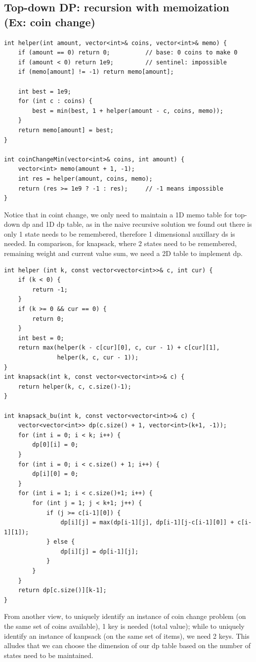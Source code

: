 \documentclass[9pt]{extarticle}
\begin{document}
\subsection*{Top-down DP: recursion with memoization (Ex: coin change)}
\begin{lstlisting}
int helper(int amount, vector<int>& coins, vector<int>& memo) {
    if (amount == 0) return 0;          // base: 0 coins to make 0
    if (amount < 0) return 1e9;         // sentinel: impossible
    if (memo[amount] != -1) return memo[amount];

    int best = 1e9;
    for (int c : coins) {
        best = min(best, 1 + helper(amount - c, coins, memo));
    }
    return memo[amount] = best;
}

int coinChangeMin(vector<int>& coins, int amount) {
    vector<int> memo(amount + 1, -1);
    int res = helper(amount, coins, memo);
    return (res >= 1e9 ? -1 : res);     // -1 means impossible
}
\end{lstlisting}
Notice that in coint change, we only need to maintain a 1D memo table for top-down dp and 1D dp table, 
as in the naive recursive solution we found out there is only 1 state needs to be remembered, therefore
1 dimensional auxillary ds is needed. In comparison, for knapsack, where 2 states need to be remembered, 
remaining weight and current value sum, we need a 2D table to implement dp.
\begin{lstlisting}
int helper (int k, const vector<vector<int>>& c, int cur) {
    if (k < 0) {
        return -1;
    }
    if (k >= 0 && cur == 0) {
        return 0;
    }
    int best = 0;
    return max(helper(k - c[cur][0], c, cur - 1) + c[cur][1], 
               helper(k, c, cur - 1));
}
int knapsack(int k, const vector<vector<int>>& c) {
    return helper(k, c, c.size()-1);
}

int knapsack_bu(int k, const vector<vector<int>>& c) {
    vector<vector<int>> dp(c.size() + 1, vector<int>(k+1, -1));
    for (int i = 0; i < k; i++) {
        dp[0][i] = 0;
    }
    for (int i = 0; i < c.size() + 1; i++) {
        dp[i][0] = 0;
    }
    for (int i = 1; i < c.size()+1; i++) {
        for (int j = 1; j < k+1; j++) {
            if (j >= c[i-1][0]) {
                dp[i][j] = max(dp[i-1][j], dp[i-1][j-c[i-1][0]] + c[i-1][1]);
            } else {
                dp[i][j] = dp[i-1][j];
            }
        }
    }
    return dp[c.size()][k-1];
}
\end{lstlisting}

From another view, to uniquely identify an 
instance of coin change problem (on the same set of coins available), 1 key is needed (total value); while to uniquely identify
an instance of kanpsack (on the same set of items), we need 2 keys. This alludes that we can choose the dimension of our dp table 
based on the number of states need to be maintained. 
\end{document}
